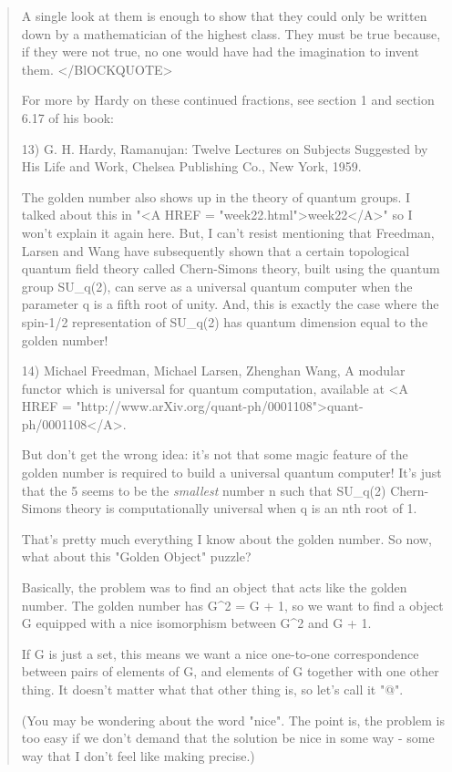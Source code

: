 \begin{quote}
A single look at them is enough to show that they
could only be written down by a mathematician of the highest
class.  They must be true because, if they were not true,
no one would have had the imagination to invent them.  
</BlOCKQUOTE>

For more by Hardy on these continued fractions, see section 1 and
section 6.17 of his book:

13) G. H. Hardy, Ramanujan: Twelve Lectures on Subjects Suggested
by His Life and Work, Chelsea Publishing Co., New York, 1959.

The golden number also shows up in the theory of quantum groups.  
I talked about this in "<A HREF = "week22.html">week22</A>" so 
I won't explain it again here.  
But, I can't resist mentioning that Freedman, Larsen and Wang have
subsequently shown that a certain topological quantum field theory 
called Chern-Simons theory, built using the quantum group SU_{q}(2), 
can serve as a universal quantum computer when the parameter q is a 
fifth root of unity.  And, this is exactly the case where the spin-1/2 
representation of SU_{q}(2) 
has quantum dimension equal to the golden number!  

14) Michael Freedman, Michael Larsen, Zhenghan Wang, 
A modular functor which is universal for quantum computation,
available at <A HREF = "http://www.arXiv.org/quant-ph/0001108">quant-ph/0001108</A>.

But don't get the wrong idea: it's not that some magic feature of the 
golden number is required to build a universal quantum computer!  It's 
just that the 5 seems to be the \emph{smallest} 
number n such that SU_{q}(2)
Chern-Simons theory is computationally universal when q is an nth root of 1.

That's pretty much everything I know about the golden number.  So now, 
what about this "Golden Object" puzzle? 

Basically, the problem was to find an object that acts like the golden 
number.  The golden number has 
G^{2} = G + 1, so we want to find
a object G equipped with a nice isomorphism between G^{2} and
G + 1.

If G is just a set, this means we want a nice one-to-one correspondence between 
pairs of elements of G, and elements of G together with one other thing.
It doesn't matter what that other thing is, so let's call it "@".

(You may be wondering about the word "nice".  The point is, the 
problem
is too easy if we don't demand that the solution be nice in some way -
some way that I don't feel like making precise.)


\end{quote}

